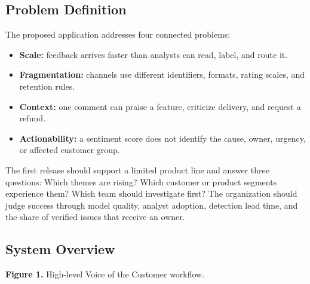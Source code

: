 \documentclass[11pt,a4paper,twoside]{article}
\begin{document}
\subsection{Problem Definition}

The proposed application addresses four connected problems:

\begin{itemize}
  \item \textbf{Scale:} feedback arrives faster than analysts can read, label, and route it.
  \item \textbf{Fragmentation:} channels use different identifiers, formats, rating scales, and retention rules.
  \item \textbf{Context:} one comment can praise a feature, criticize delivery, and request a refund.
  \item \textbf{Actionability:} a sentiment score does not identify the cause, owner, urgency, or affected customer group.
\end{itemize}

The first release should support a limited product line and answer three questions: Which themes are rising? Which customer or product segments experience them? Which team should investigate first? The organization should judge success through model quality, analyst adoption, detection lead time, and the share of verified issues that receive an owner.

\subsection{System Overview}

\begin{center}

\vspace{0.1em}
{\small\textbf{Figure 1.} High-level Voice of the Customer workflow.}
\end{center}
\end{document}
